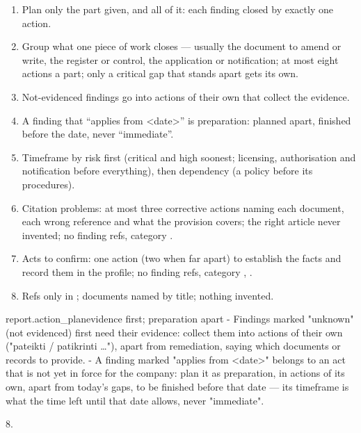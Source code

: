 \begin{enumerate}[itemsep=1pt, topsep=3pt]
  \item Plan only the part given, and all of it: each finding closed by exactly one action.
  \item Group what one piece of work closes --- usually the document to amend or write, the
    register or control, the application or notification; at most eight actions a part; only a
    critical gap that stands apart gets its own.
  \item Not-evidenced findings go into actions of their own that collect the evidence.
  \item A finding that \enquote{applies from <date>} is preparation: planned apart, finished
    before the date, never \enquote{immediate}.
  \item Timeframe by risk first (critical and high soonest; licensing, authorisation and
    notification before everything), then dependency (a policy before its procedures).
  \item Citation problems: at most three corrective actions naming each document, each wrong
    reference and what the provision covers; the right article never invented; no finding refs,
    category .
  \item Acts to confirm: one action (two when far apart) to establish the facts and record
    them in the profile; no finding refs, category , .
  \item Refs only in ; documents named by title; nothing invented.
\end{enumerate}

\par\nopagebreak
\begin{promptexcerpt}{report.action_plan}{evidence first; preparation apart}
- Findings marked "unknown" (not evidenced) first need their evidence: collect them
  into actions of their own ("pateikti / patikrinti …"), apart from remediation,
  saying which documents or records to provide.
- A finding marked "applies from <date>" belongs to an act that is not yet in force
  for the company: plan it as preparation, in actions of its own, apart from today's
  gaps, to be finished before that date — its timeframe is what the time left until
  that date allows, never "immediate".
\end{promptexcerpt}

 8.


